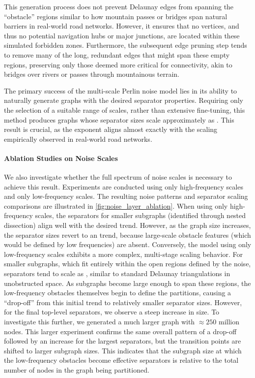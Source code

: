 This generation process does not prevent Delaunay edges from spanning the \enquote{obstacle} regions similar to how mountain passes or bridges span natural barriers in real-world road networks.
However, it ensures that no vertices, and thus no potential navigation hubs or major junctions, are located within these simulated forbidden zones.
Furthermore, the subsequent edge pruning step tends to remove many of the long, redundant edges that might span these empty regions, preserving only those deemed more critical for connectivity, akin to bridges over rivers or passes through mountainous terrain.

The primary success of the multi-scale Perlin noise model lies in its ability to naturally generate graphs with the desired separator properties.
Requiring only the selection of a suitable range of scales, rather than extensive fine-tuning, this method produces graphs whose separator sizes scale approximately as .
This result is crucial, as the exponent aligns almost exactly with the scaling empirically observed in real-world road networks.

\paragraph{Ablation Studies on Noise Scales}

We also investigate whether the full spectrum of noise scales is necessary to achieve this result.
Experiments are conducted using only high-frequency scales and only low-frequency scales.
The resulting noise patterns and separator scaling comparisons are illustrated in \cref{fig:noise_layer_ablation}.
When using only high-frequency scales, the separators for smaller subgraphs (identified through nested dissection) align well with the desired trend.
However, as the graph size increases, the separator sizes revert to an  trend, because large-scale obstacle features (which would be defined by low frequencies) are absent.
Conversely, the model using only low-frequency scales exhibits a more complex, multi-stage scaling behavior.
For smaller subgraphs, which fit entirely within the open regions defined by the noise, separators tend to scale as , similar to standard Delaunay triangulations in unobstructed space.
As subgraphs become large enough to span these regions, the low-frequency obstacles themselves begin to define the partitions, causing a \enquote{drop-off} from this initial trend to relatively smaller separator sizes.
However, for the final top-level separators, we observe a steep increase in size.
To investigate this further, we generated a much larger graph with \(\approx 250\) million nodes.
This larger experiment confirms the same overall pattern of a drop-off followed by an increase for the largest separators, but the transition points are shifted to larger subgraph sizes.
This indicates that the subgraph size at which the low-frequency obstacles become effective separators is relative to the total number of nodes in the graph being partitioned.

